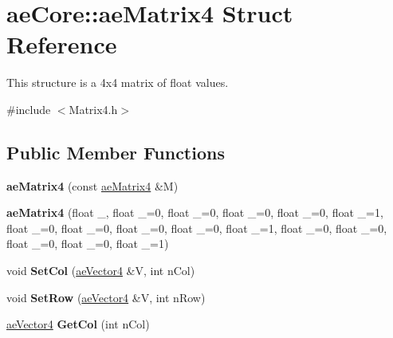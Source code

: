 \hypertarget{structae_core_1_1ae_matrix4}{}\section{ae\+Core\+:\+:ae\+Matrix4 Struct Reference}
\label{structae_core_1_1ae_matrix4}


This structure is a 4x4 matrix of float values.  




{\ttfamily \#include $<$Matrix4.\+h$>$}

\subsection*{Public Member Functions}
\begin{DoxyCompactItemize}
\item 
{\bfseries ae\+Matrix4} (const \hyperlink{structae_core_1_1ae_matrix4}{ae\+Matrix4} \&M)\hypertarget{structae_core_1_1ae_matrix4_ab6c8b90c1535b8bdae036e0f8665331d}{}\label{structae_core_1_1ae_matrix4_ab6c8b90c1535b8bdae036e0f8665331d}

\item 
{\bfseries ae\+Matrix4} (float \+\_, float \+\_=0, float \+\_=0, float \+\_=0, float \+\_=0, float \+\_=1, float \+\_=0, float \+\_=0, float \+\_=0, float \+\_=0, float \+\_=1, float \+\_=0, float \+\_=0, float \+\_=0, float \+\_=0, float \+\_=1)\hypertarget{structae_core_1_1ae_matrix4_a67c01cd6e4a132d837cd60ab95e8242d}{}\label{structae_core_1_1ae_matrix4_a67c01cd6e4a132d837cd60ab95e8242d}

\item 
void {\bfseries Set\+Col} (\hyperlink{structae_core_1_1ae_vector4}{ae\+Vector4} \&V, int n\+Col)\hypertarget{structae_core_1_1ae_matrix4_a8e97ad8c4de58ac761efd86fe62fcb5e}{}\label{structae_core_1_1ae_matrix4_a8e97ad8c4de58ac761efd86fe62fcb5e}

\item 
void {\bfseries Set\+Row} (\hyperlink{structae_core_1_1ae_vector4}{ae\+Vector4} \&V, int n\+Row)\hypertarget{structae_core_1_1ae_matrix4_ab7d0bad2bff73aa05cc3e7a10bf22874}{}\label{structae_core_1_1ae_matrix4_ab7d0bad2bff73aa05cc3e7a10bf22874}

\item 
\hyperlink{structae_core_1_1ae_vector4}{ae\+Vector4} {\bfseries Get\+Col} (int n\+Col)\hypertarget{structae_core_1_1ae_matrix4_a93d98eaaa7471eb5d7d7178d1f783a3d}{}\label{structae_core_1_1ae_matrix4_a93d98eaaa7471eb5d7d7178d1f783a3d}


\end{DoxyCompactItemize}
